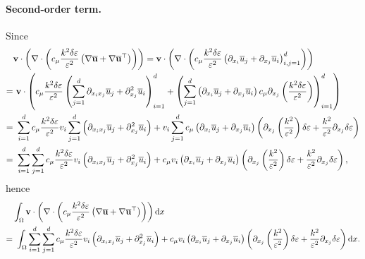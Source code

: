 \documentclass[oneside,11pt]{book}
\numberwithin{equation}{section}
\begin{document}
\paragraph*{Second-order term.} Since
\begin{align*}
    &{\bf v}\cdot\left(\nabla\cdot\left(c_\mu\frac{k^2\delta\varepsilon}{\varepsilon^2}\left(\nabla\overline{\bf u} + \nabla\overline{\bf u}^\top\right)\right)\right) = {\bf v}\cdot\left(\nabla\cdot\left(c_\mu\frac{k^2\delta\varepsilon}{\varepsilon^2}\left(\partial_{x_i}\overline{u}_j + \partial_{x_j}\overline{u}_i\right)_{i,j=1}^d\right)\right)\\
    =&\ {\bf v}\cdot\left(c_\mu\frac{k^2\delta\varepsilon}{\varepsilon^2}\left(\sum_{j=1}^d \partial_{x_ix_j}\overline{u}_j + \partial_{x_j}^2\overline{u}_i\right)_{i=1}^d + \left(\sum_{j=1}^d \left(\partial_{x_i}\overline{u}_j + \partial_{x_j}\overline{u}_i\right)c_\mu\partial_{x_j}\left(\frac{k^2\delta\varepsilon}{\varepsilon^2}\right)\right)_{i=1}^d\right)\\
    =&\ \sum_{i=1}^d c_\mu\frac{k^2\delta\varepsilon}{\varepsilon^2}v_i\sum_{j=1}^d \left(\partial_{x_ix_j}\overline{u}_j + \partial_{x_j}^2\overline{u}_i\right) + v_i\sum_{j=1}^d c_\mu\left(\partial_{x_i}\overline{u}_j + \partial_{x_j}\overline{u}_i\right)\left(\partial_{x_j}\left(\frac{k^2}{\varepsilon^2}\right)\delta\varepsilon + \frac{k^2}{\varepsilon^2}\partial_{x_j}\delta\varepsilon\right)\\
    =&\ \sum_{i=1}^d\sum_{j=1}^d c_\mu\frac{k^2\delta\varepsilon}{\varepsilon^2}v_i\left(\partial_{x_ix_j}\overline{u}_j + \partial_{x_j}^2\overline{u}_i\right) + c_\mu v_i\left(\partial_{x_i}\overline{u}_j + \partial_{x_j}\overline{u}_i\right)\left(\partial_{x_j}\left(\frac{k^2}{\varepsilon^2}\right)\delta\varepsilon + \frac{k^2}{\varepsilon^2}\partial_{x_j}\delta\varepsilon\right),
\end{align*}
hence
\begin{align*}
    &\int_\Omega {\bf v}\cdot\left(\nabla\cdot\left(c_\mu\frac{k^2\delta\varepsilon}{\varepsilon^2}\left(\nabla\overline{\bf u} + \nabla\overline{\bf u}^\top\right)\right)\right){\rm d}x\\
    =&\ \int_\Omega \sum_{i=1}^d\sum_{j=1}^d c_\mu\frac{k^2\delta\varepsilon}{\varepsilon^2}v_i\left(\partial_{x_ix_j}\overline{u}_j + \partial_{x_j}^2\overline{u}_i\right) + c_\mu v_i\left(\partial_{x_i}\overline{u}_j + \partial_{x_j}\overline{u}_i\right)\left(\partial_{x_j}\left(\frac{k^2}{\varepsilon^2}\right)\delta\varepsilon + \frac{k^2}{\varepsilon^2}\partial_{x_j}\delta\varepsilon\right){\rm d}x.
\end{align*}
\end{document}
